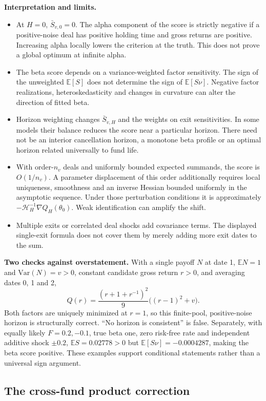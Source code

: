 \documentclass[11pt]{article}
\newcommand{\E}{\mathbb{E}}
\newcommand{\Var}{\mathrm{Var}}
\theoremstyle{plain}
\theoremstyle{definition}
\begin{document}
\textbf{Interpretation and limits.}
\begin{itemize}
\item At $H=0$, $\bar S_{v,0}=0$. The alpha component of the score is strictly negative if a positive-noise deal has positive holding time and gross returns are positive. Increasing alpha locally lowers the criterion at the truth. This does not prove a global optimum at infinite alpha.
\item The beta score depends on a variance-weighted factor sensitivity. The sign of the unweighted $\E[S]$ does not determine the sign of $\E[S\nu]$. Negative factor realizations, heteroskedasticity and changes in curvature can alter the direction of fitted beta.
\item Horizon weighting changes $\bar S_{v,H}$ and the weights on exit sensitivities. In some models their balance reduces the score near a particular horizon. There need not be an interior cancellation horizon, a monotone beta profile or an optimal horizon related universally to fund life.
\item With order-$n_v$ deals and uniformly bounded expected summands, the score is $O(1/n_v)$. A parameter displacement of this order additionally requires local uniqueness, smoothness and an inverse Hessian bounded uniformly in the asymptotic sequence. Under those perturbation conditions it is approximately $-\mathcal H_H^{-1}\nabla Q_H(\theta_0)$. Weak identification can amplify the shift.
\item Multiple exits or correlated deal shocks add covariance terms. The displayed single-exit formula does not cover them by merely adding more exit dates to the sum.
\end{itemize}

\textbf{Two checks against overstatement.} With a single payoff $N$ at date 1, $\E N=1$ and $\Var(N)=v>0$, constant candidate gross return $r>0$, and averaging dates 0, 1 and 2,
\[
Q(r)=\frac{(r+1+r^{-1})^2}{9}\bigl((r-1)^2+v\bigr).
\]
Both factors are uniquely minimized at $r=1$, so this finite-pool, positive-noise horizon is structurally correct. ``No horizon is consistent'' is false. Separately, with equally likely $F=0.2,-0.1$, true beta one, zero risk-free rate and independent additive shock $\pm0.2$, $\E S=0.02778>0$ but $\E[S\nu]=-0.0004287$, making the beta score positive. These examples support conditional statements rather than a universal sign argument.

\subsection{The cross-fund product correction}
\end{document}
